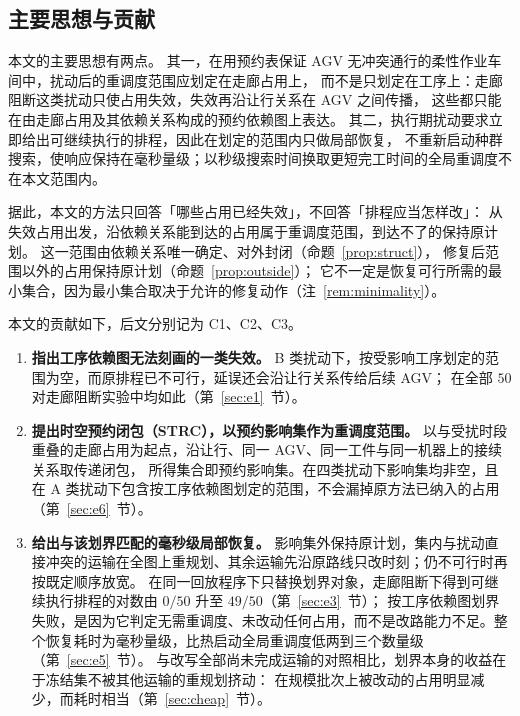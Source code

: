 \documentclass[manuscript,screen,review]{acmart}
\providecommand{\STRC}{\textsc{STRC}}
\newcommand{\NPairs}{50}
\newcommand{\FeasRone}{0/\NPairs}            %
\newcommand{\FeasRtwo}{49/\NPairs}           %
\begin{document}
\subsection{主要思想与贡献}
\label{sec:contributions}

本文的主要思想有两点。
其一，在用预约表保证 AGV 无冲突通行的柔性作业车间中，扰动后的重调度范围应划定在走廊占用上，
而不是只划定在工序上：走廊阻断这类扰动只使占用失效，失效再沿让行关系在 AGV 之间传播，
这些都只能在由走廊占用及其依赖关系构成的预约依赖图上表达。
其二，执行期扰动要求立即给出可继续执行的排程，因此在划定的范围内只做局部恢复，
不重新启动种群搜索，使响应保持在毫秒量级；以秒级搜索时间换取更短完工时间的全局重调度不在本文范围内。

据此，本文的方法只回答「哪些占用已经失效」，不回答「排程应当怎样改」：
从失效占用出发，沿依赖关系能到达的占用属于重调度范围，到达不了的保持原计划。
这一范围由依赖关系唯一确定、对外封闭（命题~\ref{prop:struct}），
修复后范围以外的占用保持原计划（命题~\ref{prop:outside}）；
它不一定是恢复可行所需的最小集合，因为最小集合取决于允许的修复动作（注~\ref{rem:minimality}）。

本文的贡献如下，后文分别记为 C1、C2、C3。
\begin{enumerate}[label=\textbf{C\arabic*.},leftmargin=2.2em,itemsep=0.4em]
\item \textbf{指出工序依赖图无法刻画的一类失效。}
B 类扰动下，按受影响工序划定的范围为空，而原排程已不可行，延误还会沿让行关系传给后续 AGV；
在全部 \(\NPairs\) 对走廊阻断实验中均如此（第~\ref{sec:e1}~节）。

\item \textbf{提出时空预约闭包（\STRC），以预约影响集作为重调度范围。}
以与受扰时段重叠的走廊占用为起点，沿让行、同一 AGV、同一工件与同一机器上的接续关系取传递闭包，
所得集合即预约影响集。在四类扰动下影响集均非空，且在 A 类扰动下包含按工序依赖图划定的范围，不会漏掉原方法已纳入的占用（第~\ref{sec:e6}~节）。

\item \textbf{给出与该划界匹配的毫秒级局部恢复。}
影响集外保持原计划，集内与扰动直接冲突的运输在全图上重规划、其余运输先沿原路线只改时刻；仍不可行时再按既定顺序放宽。
在同一回放程序下只替换划界对象，走廊阻断下得到可继续执行排程的对数由 \(\FeasRone\) 升至 \(\FeasRtwo\)（第~\ref{sec:e3}~节）；
按工序依赖图划界失败，是因为它判定无需重调度、未改动任何占用，而不是改路能力不足。整个恢复耗时为毫秒量级，比热启动全局重调度低两到三个数量级（第~\ref{sec:e5}~节）。
与改写全部尚未完成运输的对照相比，划界本身的收益在于冻结集不被其他运输的重规划挤动：
在规模批次上被改动的占用明显减少，而耗时相当（第~\ref{sec:cheap}~节）。
\end{enumerate}
\end{document}
